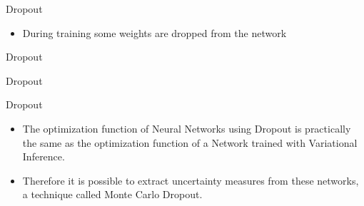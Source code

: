 \documentclass[10pt]{beamer}
\begin{document}
\begin{frame}[fragile]{Dropout}
\begin{itemize}
\item During training some weights are dropped from the network
\end{itemize}
\end{frame}

\begin{frame}[fragile]{Dropout}
    
\end{frame}

\begin{frame}[fragile]{Dropout}
    
\end{frame}

\begin{frame}[fragile]{Dropout}
\begin{itemize}
    \item The optimization function of Neural Networks using \alert{Dropout} is practically the same
        as the optimization function of a Network trained with Variational
        Inference.
    \vspace{0.5cm}
    \item Therefore it is possible to extract uncertainty measures from these
        networks, a technique called \alert{Monte Carlo Dropout}.
\end{itemize}
\end{frame}
\end{document}
